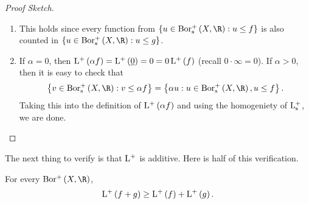 \documentclass[pmath450]{subfiles}
\begin{document}
    \begin{proof}[Proof Sketch]
        \begin{enumerate}
            \item This holds since every function from $\left\lbrace u\in\borpluss\left( X,\R \right):u\leq f \right\rbrace$ is also counted in $\left\lbrace u\in\borpluss\left( X,\R \right): u\leq g \right\rbrace$. 
            \item If $\alpha=0$, then $\operatorname{L^+}\left( \alpha f \right) = \operatorname{L^+}\left( \underline{0} \right) = 0 = 0\operatorname{L^+}\left( f \right)$ (recall $0\cdot\infty = 0$). If $\alpha>0$, then it is easy to check that
                \begin{equation*}
                    \left\lbrace v\in\borpluss\left( X,\R \right):v\leq\alpha f \right\rbrace = \left\lbrace \alpha u: u\in\borpluss\left( X,\R \right), u\leq f \right\rbrace.
                \end{equation*}
                Taking this into the definition of $\operatorname{L^+}\left( \alpha f \right)$ and using the homogeniety of $\operatorname{L^+_s}$, we are done.
        \end{enumerate}
    \end{proof}

    \np The next thing to verify is that $\operatorname{L^+}$ is additive. Here is half of this verification.

    \begin{lemma}{}
        For every $\borplus\left( X,\R \right)$,
        \begin{equation}
            \operatorname{L^+}\left( f+g \right)\geq\operatorname{L^+}\left( f \right)+\operatorname{L^+}\left( g \right).
        \end{equation}
    \end{lemma}
\end{document}
